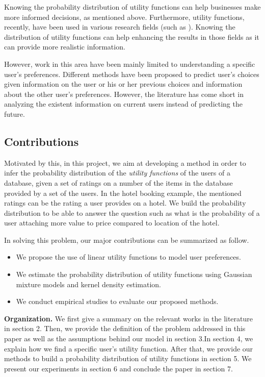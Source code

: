 	Knowing the probability distribution of utility functions can help businesses make more informed decisions, as mentioned above. Furthermore, utility functions, recently, have been used in various research fields (such as \cite{utilUse1, utilUse2}). Knowing the distribution of utility functions can help enhancing the results in those fields as it can provide more realistic information.
	
	However, work in this area have been mainly limited to understanding a specific user's preferences. Different methods have been proposed to predict user's choices given information on the user or his or her previous choices and information about the other user's preferences. However, the literature has come short in analyzing the existent information on current users instead of predicting the future.
	
	\subsection{Contributions}
	Motivated by this, in this project, we aim at developing a method in order to infer the probability distribution of the \textit{utility functions} of the users of a database, given a set of ratings on a number of the items in the database provided by a set of the users. In the hotel booking example, the mentioned ratings can be the rating a user provides on a hotel. We build the probability distribution to be able to answer the question such as what is the probability of a user attaching more value to price compared to location of the hotel.
	
	In solving this problem, our major contributions can be summarized as follow.
	\begin{itemize}
		\item{We propose the use of linear utility functions to model user preferences.}
		\item{We estimate the probability distribution of utility functions using Gaussian mixture models and kernel density estimation.}
		\item{We conduct empirical studies to evaluate our proposed methods.}
	\end{itemize}
	
	\textbf{Organization.} We first give a summary on the relevant works in the literature in section 2. Then, we provide the definition of the problem addressed in this paper as well as the assumptions behind our model in section 3.In section 4, we explain how we find a specific user's utility function. After that, we provide our methods to build a probability distribution of utility functions in section 5. We present our experiments in section 6 and conclude the paper in section 7.
	
	
	
	
	
	
